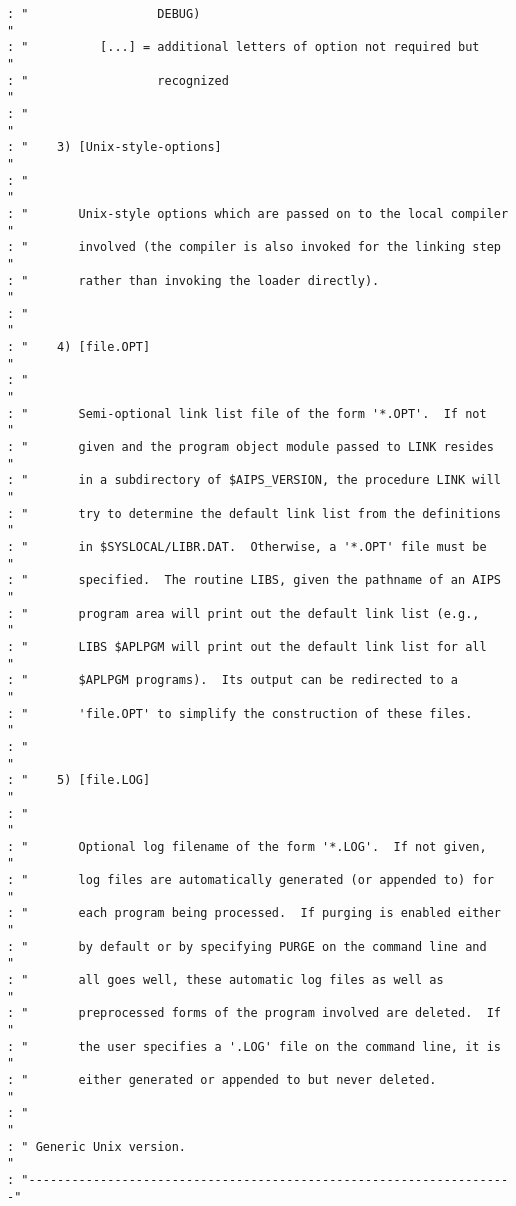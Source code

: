 \begin{verbatim}
: "                  DEBUG)                                            "
: "          [...] = additional letters of option not required but     "
: "                  recognized                                        "
: "                                                                    "
: "    3) [Unix-style-options]                                         "
: "                                                                    "
: "       Unix-style options which are passed on to the local compiler "
: "       involved (the compiler is also invoked for the linking step  "
: "       rather than invoking the loader directly).                   "
: "                                                                    "
: "    4) [file.OPT]                                                   "
: "                                                                    "
: "       Semi-optional link list file of the form '*.OPT'.  If not    "
: "       given and the program object module passed to LINK resides   "
: "       in a subdirectory of $AIPS_VERSION, the procedure LINK will  "
: "       try to determine the default link list from the definitions  "
: "       in $SYSLOCAL/LIBR.DAT.  Otherwise, a '*.OPT' file must be    "
: "       specified.  The routine LIBS, given the pathname of an AIPS  "
: "       program area will print out the default link list (e.g.,     "
: "       LIBS $APLPGM will print out the default link list for all    "
: "       $APLPGM programs).  Its output can be redirected to a        "
: "       'file.OPT' to simplify the construction of these files.      "
: "                                                                    "
: "    5) [file.LOG]                                                   "
: "                                                                    "
: "       Optional log filename of the form '*.LOG'.  If not given,    "
: "       log files are automatically generated (or appended to) for   "
: "       each program being processed.  If purging is enabled either  "
: "       by default or by specifying PURGE on the command line and    "
: "       all goes well, these automatic log files as well as          "
: "       preprocessed forms of the program involved are deleted.  If  "
: "       the user specifies a '.LOG' file on the command line, it is  "
: "       either generated or appended to but never deleted.           "
: "                                                                    "
: " Generic Unix version.                                              "
: "--------------------------------------------------------------------"


\end{verbatim}

